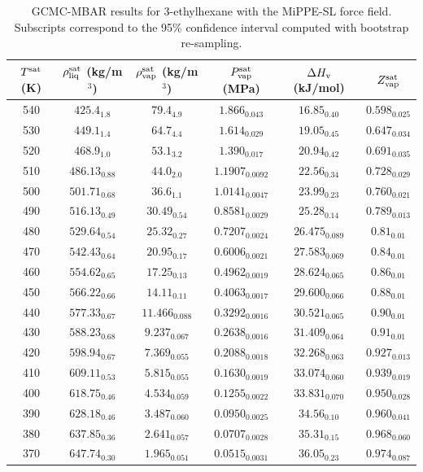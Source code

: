 \documentclass[journal=jctc,manuscript=article]{achemso}
\begin{document}
\begin{table}[htb!]
	\caption{GCMC-MBAR results for 3-ethylhexane with the MiPPE-SL force field. Subscripts correspond to the 95\% confidence interval computed with bootstrap re-sampling.}
	\begin{center}
		\begin{tabular}{|c|c|c|c|c|c|}
			\hline
			$T^{\rm sat}$ (K) & $\rho_{\rm liq}^{\rm sat}$ (kg/m$^3$) & $\rho_{\rm vap}^{\rm sat}$ (kg/m$^3$) & $P_{\rm vap}^{\rm sat}$ (MPa) & $\Delta H_{\rm v}$ (kJ/mol) & $Z_{\rm vap}^{\rm sat}$ \\ \hline
			540 & $425.4_{1.8}$ & $79.4_{4.9}$ & $1.866_{0.043}$ & $16.85_{0.40}$ & $0.598_{0.025}$ \\
			530 & $449.1_{1.4}$ & $64.7_{4.4}$ & $1.614_{0.029}$ & $19.05_{0.45}$ & $0.647_{0.034}$ \\
			520 & $468.9_{1.0}$ & $53.1_{3.2}$ & $1.390_{0.017}$ & $20.94_{0.42}$ & $0.691_{0.035}$ \\
			510 & $486.13_{0.88}$ & $44.0_{2.0}$ & $1.1907_{0.0092}$ & $22.56_{0.34}$ & $0.728_{0.029}$ \\
			500 & $501.71_{0.68}$ & $36.6_{1.1}$ & $1.0141_{0.0047}$ & $23.99_{0.23}$ & $0.760_{0.021}$ \\
			490 & $516.13_{0.49}$ & $30.49_{0.54}$ & $0.8581_{0.0029}$ & $25.28_{0.14}$ & $0.789_{0.013}$ \\
			480 & $529.64_{0.54}$ & $25.32_{0.27}$ & $0.7207_{0.0024}$ & $26.475_{0.089}$ & $0.81_{0.01}$ \\
			470 & $542.43_{0.64}$ & $20.95_{0.17}$ & $0.6006_{0.0021}$ & $27.583_{0.069}$ & $0.84_{0.01}$ \\
			460 & $554.62_{0.65}$ & $17.25_{0.13}$ & $0.4962_{0.0019}$ & $28.624_{0.065}$ & $0.86_{0.01}$ \\
			450 & $566.22_{0.66}$ & $14.11_{0.11}$ & $0.4063_{0.0017}$ & $29.600_{0.066}$ & $0.88_{0.01}$ \\
			440 & $577.33_{0.67}$ & $11.466_{0.088}$ & $0.3292_{0.0016}$ & $30.521_{0.065}$ & $0.90_{0.01}$ \\
			430 & $588.23_{0.68}$ & $9.237_{0.067}$ & $0.2638_{0.0016}$ & $31.409_{0.064}$ & $0.91_{0.01}$ \\
			420 & $598.94_{0.67}$ & $7.369_{0.055}$ & $0.2088_{0.0018}$ & $32.268_{0.063}$ & $0.927_{0.013}$ \\
			410 & $609.11_{0.53}$ & $5.815_{0.055}$ & $0.1630_{0.0019}$ & $33.074_{0.060}$ & $0.939_{0.019}$ \\
			400 & $618.75_{0.46}$ & $4.534_{0.059}$ & $0.1255_{0.0022}$ & $33.831_{0.070}$ & $0.950_{0.028}$ \\
			390 & $628.18_{0.46}$ & $3.487_{0.060}$ & $0.0950_{0.0025}$ & $34.56_{0.10}$ & $0.960_{0.041}$ \\
			380 & $637.85_{0.36}$ & $2.641_{0.057}$ & $0.0707_{0.0028}$ & $35.31_{0.15}$ & $0.968_{0.060}$ \\
			370 & $647.74_{0.30}$ & $1.965_{0.051}$ & $0.0515_{0.0031}$ & $36.05_{0.23}$ & $0.974_{0.087}$ \\
			\hline
		\end{tabular}
	\end{center}
\end{table}
\end{document}

